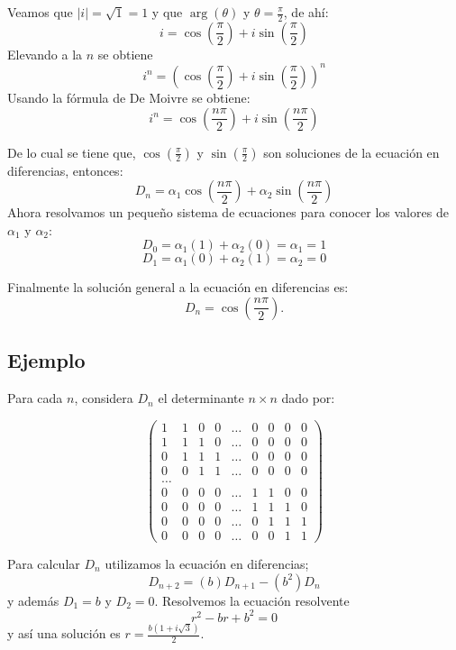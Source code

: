 \documentclass{report}
\begin{document}
Veamos que  $|i|=\sqrt{1}=1$ y que $\arg(\theta)$ y $\theta= \frac{\pi}{2}$, de ahí:
$$i=\cos(\frac{\pi}{2})+i\sin(\frac{\pi}{2})$$
Elevando a la $n$ se obtiene
$$i^n=(\cos(\frac{\pi}{2})+i\sin(\frac{\pi}{2}))^{n}$$
Usando la fórmula de De Moivre se obtiene:
$$i^n=\cos(\frac{n\pi}{2})+i\sin(\frac{n\pi}{2})$$

De lo cual se tiene que, $\cos(\frac{\pi}{2})$ y  $\sin(\frac{\pi}{2})$ son soluciones de la ecuación en diferencias, entonces: 
$$D_{n}=\alpha_{1}\cos(\frac{n\pi}{2})+\alpha_{2}\sin(\frac{n\pi}{2})$$
Ahora resolvamos un pequeño sistema de ecuaciones para conocer los valores de $\alpha_1$ y $\alpha_2$:
  $$D_{0}=\alpha_{1}(1)+\alpha_{2}(0)=\alpha_{1}=1$$
  $$D_{1}=\alpha_{1}(0)+\alpha_{2}(1)=\alpha_{2}=0$$

Finalmente la solución general a la ecuación en diferencias es:
\begin{equation}
  \label{solucion determinante}
D_{n}=\cos(\frac{n\pi}{2}).
\end{equation}


\subsection{Ejemplo}

Para cada $n$, considera $D_{n}$ el determinante $n\times n$ dado por:

\begin{equation*}
\begin{pmatrix}
1 & 1 & 0 & 0 &\ldots & 0 & 0 & 0 & 0\\
1 & 1 & 1 & 0 &\ldots & 0 & 0 & 0 & 0\\
0 & 1 & 1 & 1 &\ldots & 0 & 0 & 0 & 0\\
0 & 0 & 1 & 1 &\ldots & 0 & 0 & 0 & 0\\
\ldots\\
0 & 0 & 0 & 0 &\ldots & 1 & 1 & 0 & 0\\
0 & 0 & 0 & 0 &\ldots & 1 & 1 & 1 & 0\\
0 & 0 & 0 & 0 &\ldots & 0 & 1 & 1 & 1\\
0 & 0 & 0 & 0 &\ldots & 0 & 0 & 1 & 1
\end{pmatrix}
\end{equation*}


Para calcular $D_{n}$ utilizamos la ecuación en diferencias;
\begin{equation}
  \label{determinante2}
D_{n+2}=(b)D_{n+1}-(b^2)D_{n}
\end{equation}
 y además $D_{1}=b$ y $D_{2}=0$.
Resolvemos la ecuación resolvente $$r^{2}-br+b^2=0$$ y así una solución es $r=\frac{b(1+i \sqrt{3})}{2}$.
\end{document}
